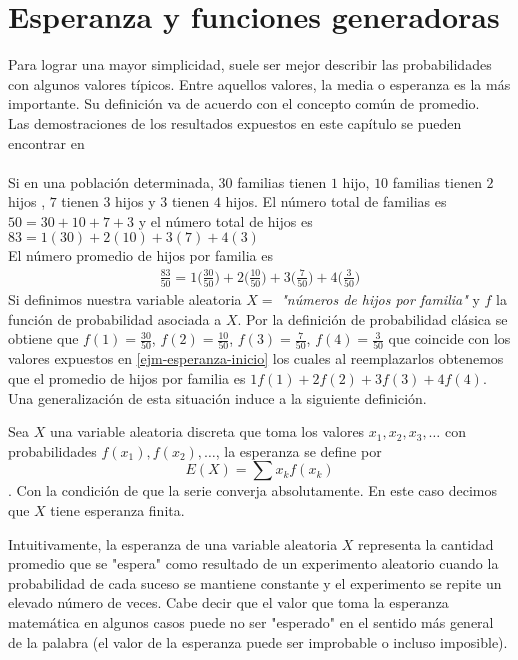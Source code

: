 \section{Esperanza y funciones generadoras}
Para lograr una mayor simplicidad, suele ser mejor describir las probabilidades con algunos valores típicos. Entre aquellos valores, la media o esperanza es la más importante. Su definición va de acuerdo con el concepto común de promedio. \\Las demostraciones de los resultados expuestos en este capítulo se pueden encontrar en
\\\\
Si en una población determinada, $30$ familias tienen $1$ hijo, $10$ familias tienen $2$ hijos , $7$ tienen $3$ hijos y $3$ tienen $4$ hijos. El número total de familias es $50=30+10+7+3$ y el número total de hijos es $83=1(30)+2(10)+3(7)+4(3)$\\
El número promedio de hijos por familia es 
\begin{eqnarray}
    \label{ejm-esperanza-inicio}
    \frac{83}{50}= 1\big(\frac{30}{50}\big)+2\big(\frac{10}{50}\big)+3\big(\frac{7}{50}\big)+4\big(\frac{3}{50}\big)
\end{eqnarray}
Si definimos nuestra variable aleatoria $X=$ \textit{"números de hijos por familia"} y $f$ la función de probabilidad asociada a $X$. Por la definición de probabilidad clásica se obtiene que $f(1)=\frac{30}{50}$, $f(2)=\frac{10}{50}$, $f(3)=\frac{7}{50}$, $f(4)=\frac{3}{50}$ que coincide con los valores expuestos en \ref{ejm-esperanza-inicio} los cuales al reemplazarlos obtenemos que el promedio de hijos por familia es $1f(1)+2f(2)+3f(3)+4f(4)$.\\Una generalización de esta situación induce a la siguiente definición.
\begin{Def}
    Sea $X$ una variable aleatoria discreta que toma los valores $x_1,x_2,x_3,\ldots$ con probabilidades $f(x_1), f(x_2),\ldots$, la esperanza se define por $$E(X)=\sum x_k f(x_k)$$. Con la condición de que la serie converja absolutamente. En este caso decimos que $X$ tiene esperanza finita.
\end{Def}
Intuitivamente, la esperanza de una variable aleatoria $X$ representa la cantidad promedio que se "espera" como resultado de un experimento aleatorio cuando la probabilidad de cada suceso se mantiene constante y el experimento se repite un elevado número de veces. Cabe decir que el valor que toma la esperanza matemática en algunos casos puede no ser "esperado" en el sentido más general de la palabra (el valor de la esperanza puede ser improbable o incluso imposible). 

